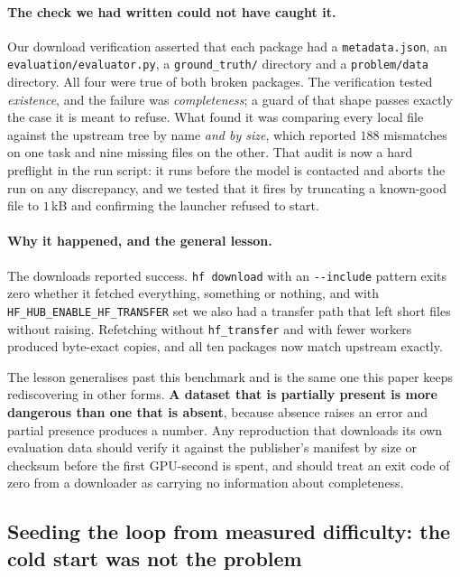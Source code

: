 \paragraph{The check we had written could not have caught it.}
Our download verification asserted that each package had a \texttt{metadata.json}, an
\texttt{evaluation/evaluator.py}, a \texttt{ground\_truth/} directory and a
\texttt{problem/data} directory. All four were true of both broken packages. The verification
tested \emph{existence}, and the failure was \emph{completeness}; a guard of that shape passes
exactly the case it is meant to refuse. What found it was comparing every local file against
the upstream tree by name \emph{and by size}, which reported $188$ mismatches on one task and
nine missing files on the other. That audit is now a hard preflight in the run script: it runs
before the model is contacted and aborts the run on any discrepancy, and we tested that it
fires by truncating a known-good file to $1$\,kB and confirming the launcher refused to start.

\paragraph{Why it happened, and the general lesson.}
The downloads reported success. \texttt{hf download} with an \texttt{-{}-include} pattern exits
zero whether it fetched everything, something or nothing, and with
\texttt{HF\_HUB\_ENABLE\_HF\_TRANSFER} set we also had a transfer path that left short files
without raising. Refetching without \texttt{hf\_transfer} and with fewer workers produced
byte-exact copies, and all ten packages now match upstream exactly.

The lesson generalises past this benchmark and is the same one this paper keeps rediscovering
in other forms. \textbf{A dataset that is partially present is more dangerous than one that is
absent}, because absence raises an error and partial presence produces a number. Any
reproduction that downloads its own evaluation data should verify it against the publisher's
manifest by size or checksum before the first GPU-second is spent, and should treat an
exit code of zero from a downloader as carrying no information about completeness.

\subsection{Seeding the loop from measured difficulty: the cold start was not the problem}
\label{sec:seededloop}

